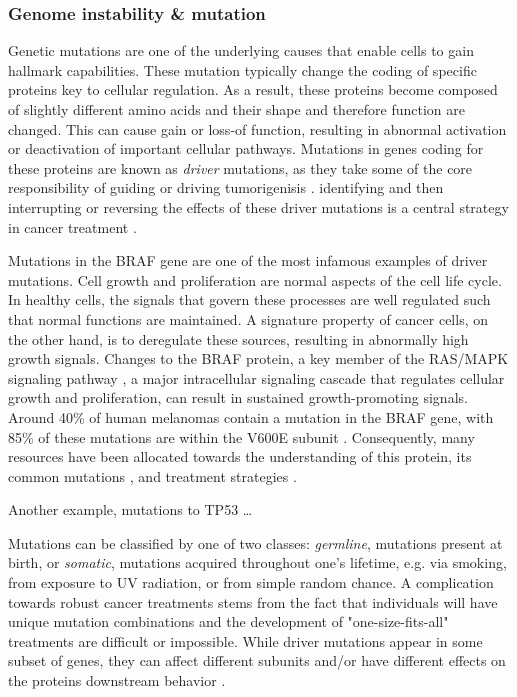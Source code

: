 \subsubsection{Genome instability \& mutation}
Genetic mutations are one of the underlying causes that enable cells to gain hallmark capabilities.
These mutation typically change the coding of specific proteins key to cellular regulation.
As a result, these proteins become composed of slightly different amino acids and their shape and therefore function are changed.
This can cause gain or loss-of function, resulting in abnormal activation or deactivation of important cellular pathways.
Mutations in genes coding for these proteins are known as \emph{driver} mutations, as they take some of the core responsibility of guiding or driving tumorigenisis \cite{martinez-jimenez2020}.
identifying and then interrupting or reversing the effects of these driver mutations is a central strategy in cancer treatment \cite{need}.

Mutations in the BRAF gene are one of the most infamous examples of driver mutations.
Cell growth and proliferation are normal aspects of the cell life cycle.
In healthy cells, the signals that govern these processes are well regulated such that normal functions are maintained.
A signature property of cancer cells, on the other hand, is to deregulate these sources, resulting in abnormally high growth signals.
Changes to the BRAF protein, a key member of the RAS/MAPK signaling pathway \cite{davies2010}, a major intracellular signaling cascade that regulates cellular growth and proliferation,
can result in sustained growth-promoting signals.
Around 40\% of human melanomas contain a mutation in the BRAF gene, with 
85\% of these mutations are within the V600E subunit \cite{spathis2019}.
Consequently, many resources have been allocated towards the understanding of this protein, its common mutations \cite{smiech2020}, and treatment strategies \cite{cheng2017}.

Another example, mutations to TP53 \ldots %

Mutations can be classified by one of two classes:
\emph{germline}, mutations present at birth, or
\emph{somatic}, mutations acquired throughout one's lifetime, e.g. via smoking, from exposure to UV radiation, or from simple random chance.
A complication towards robust cancer treatments stems from the fact that individuals will have unique mutation combinations and the development of "one-size-fits-all" treatments are difficult or impossible.
While driver mutations appear in some subset of genes, they can affect different subunits and/or have different effects on the proteins downstream behavior \cite{smiech2020}.

